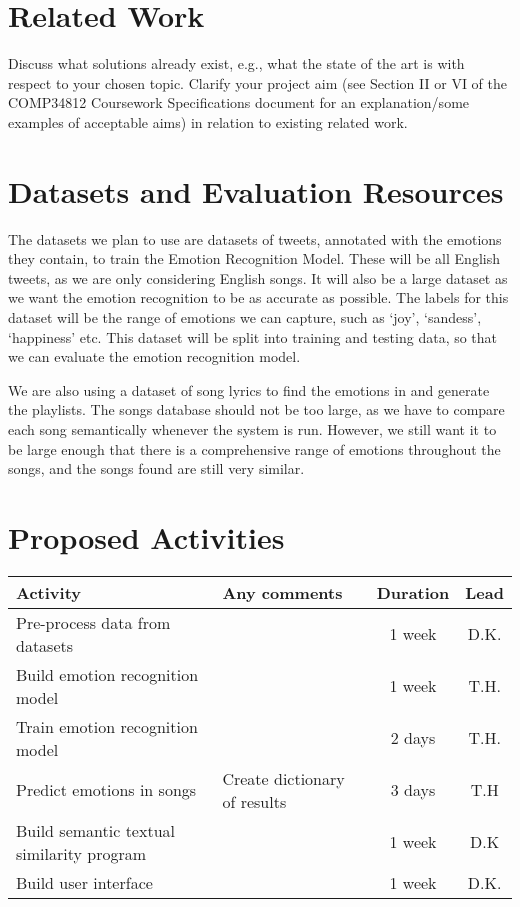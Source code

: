 \documentclass[11pt]{article}
\begin{document}
\section{Related Work}
Discuss what solutions already exist, e.g., what the state of the art is with respect to your chosen topic. Clarify your project aim (see Section II or VI of the COMP34812 Coursework Specifications document for an explanation/some examples of acceptable aims) in relation to existing related work.

\section{Datasets and Evaluation Resources}
The datasets we plan to use are datasets of tweets\cite{gupta_2021}\cite{pandey_2022}, annotated with the emotions they contain, to train the Emotion Recognition Model. These will be all English tweets, as we are only considering English songs. It will also be a large dataset as we want the emotion recognition to be as accurate as possible. The labels for this dataset will be the range of emotions we can capture, such as `joy', `sandess', `happiness' etc. This dataset will be split into training and testing data, so that we can evaluate the emotion recognition model.

We are also using a dataset of song lyrics\cite{shah_2021} to find the emotions in and generate the playlists. The songs database should not be too large, as we have to compare each song semantically whenever the system is run. However, we still want it to be large enough that there is a comprehensive range of emotions throughout the songs, and the songs found are still very similar.

\section{Proposed Activities}

\begin{table}[h]
\centering
\begin{tabular}{|l|l|c|c|}
\hline
\textbf{Activity} & \textbf{Any comments} & \textbf{Duration} & \textbf{Lead}\\
\hline
Pre-process data from datasets & & 1 week & D.K. \\
\hline
Build emotion recognition model & & 1 week & T.H. \\
\hline
Train emotion recognition model & & 2 days & T.H. \\
\hline
Predict emotions in songs & Create dictionary of results & 3 days & T.H \\
\hline
Build semantic textual similarity program & & 1 week & D.K \\
\hline
Build user interface & & 1 week & D.K. \\
\hline

\end{tabular}
\end{table}




\end{document}
